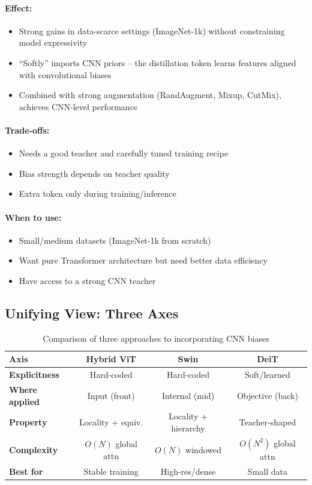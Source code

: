 \documentclass{article}
\begin{document}
\paragraph{Effect:}
\begin{itemize}
\item Strong gains in data-scarce settings (ImageNet-1k) without constraining model expressivity
\item ``Softly'' imports CNN priors -- the distillation token learns features aligned with convolutional biases
\item Combined with strong augmentation (RandAugment, Mixup, CutMix), achieves CNN-level performance
\end{itemize}

\paragraph{Trade-offs:}
\begin{itemize}
\item Needs a good teacher and carefully tuned training recipe
\item Bias strength depends on teacher quality
\item Extra token only during training/inference
\end{itemize}

\paragraph{When to use:}
\begin{itemize}
\item Small/medium datasets (ImageNet-1k from scratch)
\item Want pure Transformer architecture but need better data efficiency
\item Have access to a strong CNN teacher
\end{itemize}

\subsection{Unifying View: Three Axes}

\begin{table}[h]
\centering
\begin{tabular}{lccc}
\toprule
\textbf{Axis} & \textbf{Hybrid ViT} & \textbf{Swin} & \textbf{DeiT} \\
\midrule
\textbf{Explicitness} & Hard-coded & Hard-coded & Soft/learned \\
\textbf{Where applied} & Input (front) & Internal (mid) & Objective (back) \\
\textbf{Property} & Locality + equiv. & Locality + hierarchy & Teacher-shaped \\
\textbf{Complexity} & $O(N)$ global attn & $O(N)$ windowed & $O(N^2)$ global attn \\
\textbf{Best for} & Stable training & High-res/dense & Small data \\
\bottomrule
\end{tabular}
\caption{Comparison of three approaches to incorporating CNN biases}
\end{table}
\end{document}
